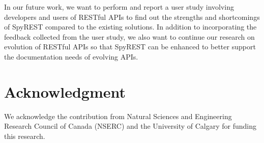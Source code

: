 \documentclass[conference]{IEEEtran}
\begin{document}
In our future work, we want to perform and report a user study involving developers and users of RESTful APIs to find out the strengths and shortcomings of SpyREST compared to the existing solutions. In addition to incorporating the feedback collected from the user study, we also want to continue our research on evolution of RESTful APIs so that SpyREST can be enhanced to better support the documentation needs of evolving APIs.

\section*{Acknowledgment}
\small
We acknowledge the contribution from Natural Sciences and Engineering Research Council of Canada (NSERC) and the University of Calgary for funding this research.

\normalsize



\end{document}
